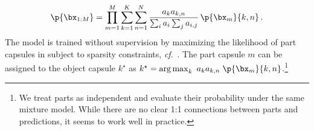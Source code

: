 \begin{equation}
    \p{\bx_{1:M}} = \prod_{m=1}^M \sum_{k=1}^K \sum_{n=1}^{N}  
    \frac{a_k a_{k,n}}{\sum_i a_i \sum_j a_{i,j}}
    \,\p{\bx_m}{k,n}\,. \label{eq:constellation_likelihood}
\end{equation}
The model is trained without supervision by maximizing the likelihood of part capsules in  subject to sparsity constraints, \textit{cf}.\ .
The part capsule $m$ can be assigned to the object capsule $k^\star$ as $k^\star = \operatorname{arg\,max}_{k}~a_k a_{k,n}\;\p{\bx_m}{k,n}$.\footnote{We treat parts as independent and evaluate their probability under the same mixture model. While there are no clear 1:1 connections between parts and predictions, it seems to work well in practice.}
